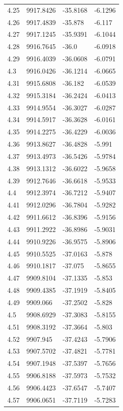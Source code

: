 \begin{table}[H]
\begin{tabular}{llll}
4.25 & 9917.8426 & -35.8168 & -6.1296 \\
4.26 & 9917.4839 & -35.878 & -6.117 \\
4.27 & 9917.1245 & -35.9391 & -6.1044 \\
4.28 & 9916.7645 & -36.0 & -6.0918 \\
4.29 & 9916.4039 & -36.0608 & -6.0791 \\
4.3 & 9916.0426 & -36.1214 & -6.0665 \\
4.31 & 9915.6808 & -36.182 & -6.0539 \\
4.32 & 9915.3184 & -36.2424 & -6.0413 \\
4.33 & 9914.9554 & -36.3027 & -6.0287 \\
4.34 & 9914.5917 & -36.3628 & -6.0161 \\
4.35 & 9914.2275 & -36.4229 & -6.0036 \\
4.36 & 9913.8627 & -36.4828 & -5.991 \\
4.37 & 9913.4973 & -36.5426 & -5.9784 \\
4.38 & 9913.1312 & -36.6022 & -5.9658 \\
4.39 & 9912.7646 & -36.6618 & -5.9533 \\
4.4 & 9912.3974 & -36.7212 & -5.9407 \\
4.41 & 9912.0296 & -36.7804 & -5.9282 \\
4.42 & 9911.6612 & -36.8396 & -5.9156 \\
4.43 & 9911.2922 & -36.8986 & -5.9031 \\
4.44 & 9910.9226 & -36.9575 & -5.8906 \\
4.45 & 9910.5525 & -37.0163 & -5.878 \\
4.46 & 9910.1817 & -37.075 & -5.8655 \\
4.47 & 9909.8104 & -37.1335 & -5.853 \\
4.48 & 9909.4385 & -37.1919 & -5.8405 \\
4.49 & 9909.066 & -37.2502 & -5.828 \\
4.5 & 9908.6929 & -37.3083 & -5.8155 \\
4.51 & 9908.3192 & -37.3664 & -5.803 \\
4.52 & 9907.945 & -37.4243 & -5.7906 \\
4.53 & 9907.5702 & -37.4821 & -5.7781 \\
4.54 & 9907.1948 & -37.5397 & -5.7656 \\
4.55 & 9906.8188 & -37.5973 & -5.7532 \\
4.56 & 9906.4423 & -37.6547 & -5.7407 \\
4.57 & 9906.0651 & -37.7119 & -5.7283 \\

\end{tabular}
\end{table}
